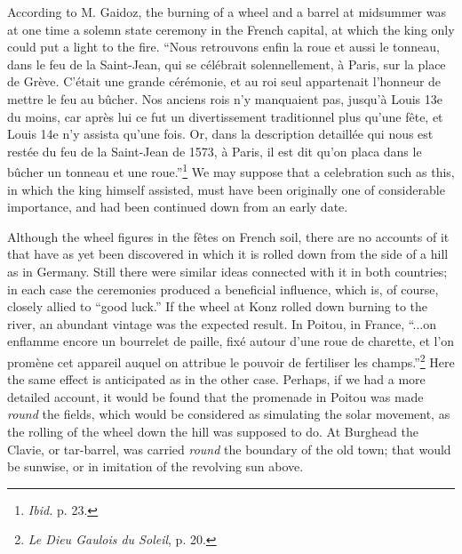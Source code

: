 \documentclass[a4paper, 11pt, oneside, polutonikogreek, english]{article}
\begin{document}
According to M. Gaidoz, the burning of a wheel and a barrel at midsummer was at one time a solemn state ceremony in the French capital, at which the king only could put a light to the fire. ``Nous retrouvons enfin la roue et aussi le tonneau, dans le feu de la Saint-Jean, qui se célébrait solennellement, à Paris, sur la place de Grève. C'était une grande cérémonie, et au roi seul appartenait l'honneur de mettre le feu au bûcher. Nos anciens rois n'y manquaient pas, jusqu'à Louis 13e du moins, car après lui ce fut un divertissement traditionnel plus qu'une fête, et Louis 14e n'y assista qu'une fois. Or, dans la description detaillée qui nous est restée du feu de la Saint-Jean de 1573, à Paris, il est dit qu'on placa dans le bûcher un tonneau et une roue.''\footnote{\emph{Ibid.} p. 23.} We may suppose that a celebration such as this, in which the king himself assisted, must have been originally one of considerable importance, and had been continued down from an early date.

Although the wheel figures in the fêtes on French soil, there are no accounts of it that have as yet been discovered in which it is rolled down from the side of a hill as in Germany. Still there were similar ideas connected with it in both countries; in each case the ceremonies produced a beneficial influence, which is, of course, closely allied to ``good luck.'' If the wheel at Konz rolled down burning to the river, an abundant vintage was the expected result. In Poitou, in France, ``...on enflamme encore un bourrelet de paille, fixé autour d'une roue de charette, et l'on promène cet appareil auquel on attribue le pouvoir de fertiliser les champs.''\footnote{\emph{Le Dieu Gaulois du Soleil}, p. 20.} Here the same effect is anticipated as in the other case. Perhaps, if we had a more detailed account, it would be found that the promenade in Poitou was made \emph{round} the fields, which would be considered as simulating the solar movement, as the rolling of the wheel down the hill was supposed to do. At Burghead the Clavie, or tar-barrel, was carried \emph{round} the boundary of the old town; that would be sunwise, or in imitation of the revolving sun above.
\end{document}
